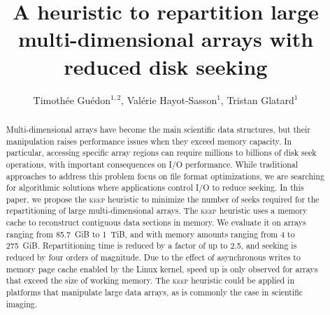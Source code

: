 \documentclass[sigconf, nonacm]{acmart}
\newcommand{\keep}[0]{\textsc{keep}\xspace}
\begin{document}
\title{A heuristic to repartition large multi-dimensional arrays with reduced disk seeking}

\author{Timoth\'ee Gu\'edon$^{1,2}$, Val\'erie Hayot-Sasson$^1$, Tristan Glatard$^1$}


\begin{abstract}
Multi-dimensional arrays have become the main scientific data structures,
but their manipulation raises performance issues when they exceed memory
capacity. In particular, accessing specific array regions can require
millions to billions of disk seek operations, with important consequences
on I/O performance. While traditional approaches to address this problem
focus on file format optimizations, we are searching for algorithmic
solutions where applications control I/O to reduce
seeking. In this paper, we propose the \keep heuristic to minimize the
number of seeks required for the repartitioning of large multi-dimensional
arrays. The \keep heuristic uses a memory cache to reconstruct contiguous
data sections in memory. We evaluate it on arrays ranging from 85.7~GiB to
1~TiB, and with memory amounts ranging from 4 to 275~GiB. Repartitioning
time is reduced by a factor of up to 2.5, and seeking is reduced by four orders
of magnitude. Due to the effect of asynchronous writes to memory page cache
enabled by the Linux kernel, speed up is only observed for arrays that
exceed the size of working memory. The \keep heuristic could be applied in
platforms that manipulate large data arrays, as is commonly the case in
scientific imaging.
\end{abstract}

\listoffixmes

\newpage

\maketitle
\end{document}
